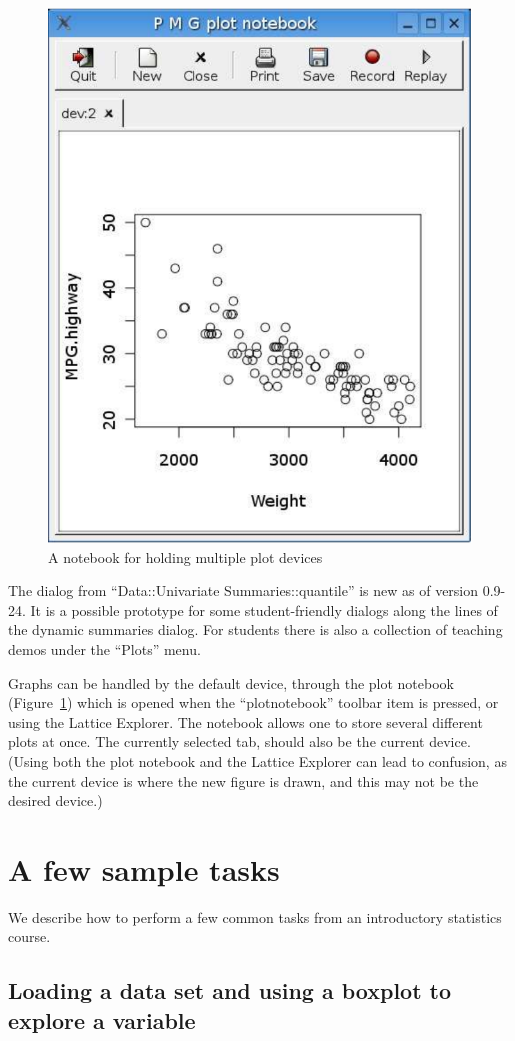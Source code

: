 \documentclass[12pt]{article}
\begin{document}
\begin{figure}[htb]
  \centering
  \includegraphics[width=.5\textwidth]{pmg-plotnotebook}
  \caption{A notebook for holding multiple plot devices}
  \label{fig:pmg-gui-plotnotebook-dialog}
\end{figure}



The dialog from ``Data::Univariate Summaries::quantile'' is new as of
version 0.9-24. It is a possible prototype for some student-friendly
dialogs along the lines of the dynamic summaries dialog. For students
there is also a collection of teaching demos under the ``Plots'' menu.

Graphs can be handled by the default device, through the plot notebook
(Figure~\ref{fig:pmg-gui-plotnotebook-dialog}) which is opened when
the ``plotnotebook'' toolbar item is pressed, or using the Lattice
Explorer. The notebook allows one to store several different plots at
once. The currently selected tab, should also be the current device.
(Using both the plot notebook and the Lattice Explorer can lead to
confusion, as the current device is where the new figure is drawn, and
this may not be the desired device.)


\section{A few sample tasks}

We describe how to perform a few common tasks from an introductory
statistics course.

\subsection{Loading a data set and using a boxplot to explore a
  variable}
\end{document}
